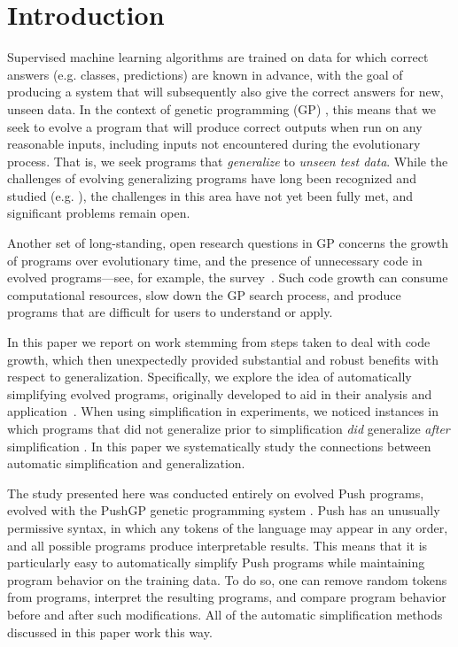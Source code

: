 \section{Introduction}
\label{sec:intro}

Supervised machine learning algorithms are trained on data for which correct answers (e.g. classes, predictions) are known in advance, with the goal of producing a system that will subsequently also give the correct answers for new, unseen data. In the context of genetic programming (GP) \cite{koza:book}, this means that we seek to evolve a program that will produce correct outputs when run on any reasonable inputs, including inputs not encountered during the evolutionary process. That is, we seek programs that {\it generalize} to \textit{unseen test data}. While the challenges of evolving generalizing programs have long been recognized and studied (e.g. \cite{1144159, DBLP:conf/gecco/VanneschiG09, Castelli:2010:cec, Goncalves:2015:EuroGP}), the challenges in this area have not yet been fully met, and significant  problems remain open.

Another set of long-standing, open research questions in GP concerns the growth of programs over evolutionary time, and the presence of unnecessary code in evolved programs---see, for example, the survey~\cite{silva2012operator}. Such code growth can consume computational resources, slow down the GP search process, and produce programs that are difficult for users to understand or apply.

In this paper we report on work stemming from steps taken to deal with code growth, which then unexpectedly provided substantial and robust benefits with respect to generalization. Specifically, we explore the idea of automatically simplifying evolved programs, originally developed to aid in their analysis and application~\cite{Spector:2014:GECCOcomp}. When using simplification in experiments, we noticed instances in which programs that did not generalize prior to simplification {\it did} generalize {\it after} simplification \cite{Helmuth:2015:dissertation}. In this paper we systematically study the connections between automatic simplification and generalization.

The study presented here was conducted entirely on evolved Push programs, evolved with the PushGP genetic programming system \cite{spector:2002:GPEM}. Push has an unusually permissive syntax, in which any tokens of the language may appear in any order, and all possible programs produce interpretable results. This means that it is particularly easy to automatically simplify Push programs while maintaining program behavior on the training data. To do so, one can remove random tokens from programs, interpret the resulting programs, and compare program behavior before and after such modifications. All of the automatic simplification methods discussed in this paper work this way. 

